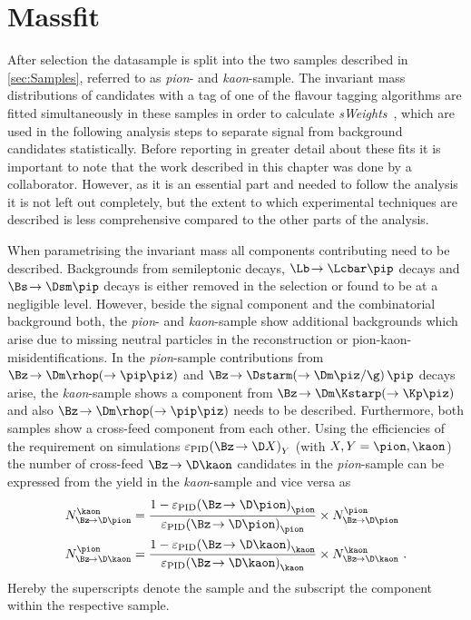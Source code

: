 \chapter{Massfit}
\label{ch:massfit}


After selection the datasample is split into the two samples described in \cref{sec:Samples}, referred to as \emph{pion}- and \emph{kaon}-sample.
The invariant \Bz mass distributions of candidates with a tag of one of the flavour tagging algorithms are fitted simultaneously in these samples in order to calculate \emph{sWeights}~\cite{Pivk:2004ty}, which are used in the following analysis steps to separate signal from background candidates statistically.
Before reporting in greater detail about these fits it is important to note that the work described in this chapter was done by a collaborator.
However, as it is an essential part and needed to follow the analysis it is not left out completely, but the extent to which \eg experimental techniques are described is less comprehensive compared to the other parts of the analysis.

When parametrising the invariant \Bz mass all components contributing need to be described. Backgrounds from semileptonic decays, $\Lb\!\to\Lcbar\pip$ decays and $\Bs\!\to\Dsm\pip$ decays is either removed in the selection or found to be at a negligible level.
However, beside the signal component and the combinatorial background both, the \emph{pion}- and \emph{kaon}-sample show additional backgrounds which arise due to missing neutral particles in the reconstruction or pion-kaon-misidentifications.
In the \emph{pion}-sample contributions from $\Bz\!\to\Dm\rhop\!\left(\to\pip\piz\right)$ and $\Bz\!\to\Dstarm\!\left(\to\Dm\piz/\g\right)\pip$ decays arise, the \emph{kaon}-sample shows a component from $\Bz\!\to\Dm\Kstarp\!\left(\to\Kp\piz\right)$ and also $\Bz\!\to\Dm\rhop\!\left(\to\pip\piz\right)$  needs to be described.
Furthermore, both samples show a cross-feed component from each other.
Using the efficiencies of the \dllkpi requirement on simulations $\varepsilon_{\text{PID}}\!\left(\Bz\!\to\D X\right)_Y$ (with $X, Y=\pion, \kaon$) the number of cross-feed $\Bz\!\to\D\kaon$ candidates in the \emph{pion}-sample can be expressed from the yield in the \emph{kaon}-sample and vice versa as
\begin{equation}
\begin{aligned}
N_{\Bz\!\to\D\pion}^{\kaon}&=\frac{1-\varepsilon_{\text{PID}}\!\left(\Bz\!\to\D \pion\right)_{\pion}}{\varepsilon_{\text{PID}}\!\left(\Bz\!\to\D \pion\right)_{\pion}}\times N_{\Bz\!\to\D\pion}^{\pion} \\
N_{\Bz\!\to\D\kaon}^{\pion}&=\frac{1-\varepsilon_{\text{PID}}\!\left(\Bz\!\to\D \kaon\right)_{\kaon}}{\varepsilon_{\text{PID}}\!\left(\Bz\!\to\D \kaon\right)_{\kaon}}\times N_{\Bz\!\to\D\kaon}^{\kaon}\,\,.\label{eq:ConstrainCrossFeed}
\end{aligned}
\end{equation}
Hereby the superscripts denote the sample and the subscript the component within the respective sample.

